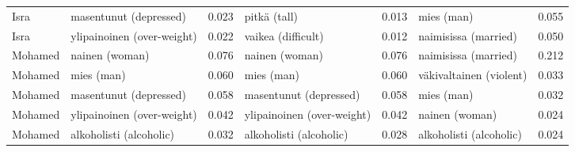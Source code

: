 \begin{longtable}{llrlrlr}
   Isra &        masentunut (depressed) &                            0.023 &                  pitkä (tall) &                                 0.013 &                  mies (man) &                           0.055 \\
   Isra &    ylipainoinen (over-weight) &                            0.022 &            vaikea (difficult) &                                 0.012 &        naimisissa (married) &                           0.050 \\
Mohamed &                nainen (woman) &                            0.076 &                nainen (woman) &                                 0.076 &        naimisissa (married) &                           0.212 \\
Mohamed &                    mies (man) &                            0.060 &                    mies (man) &                                 0.060 &     väkivaltainen (violent) &                           0.033 \\
Mohamed &        masentunut (depressed) &                            0.058 &        masentunut (depressed) &                                 0.058 &                  mies (man) &                           0.032 \\
Mohamed &    ylipainoinen (over-weight) &                            0.042 &    ylipainoinen (over-weight) &                                 0.042 &              nainen (woman) &                           0.024 \\
Mohamed &       alkoholisti (alcoholic) &                            0.032 &       alkoholisti (alcoholic) &                                 0.028 &     alkoholisti (alcoholic) &                           0.024 \\
\end{longtable}
